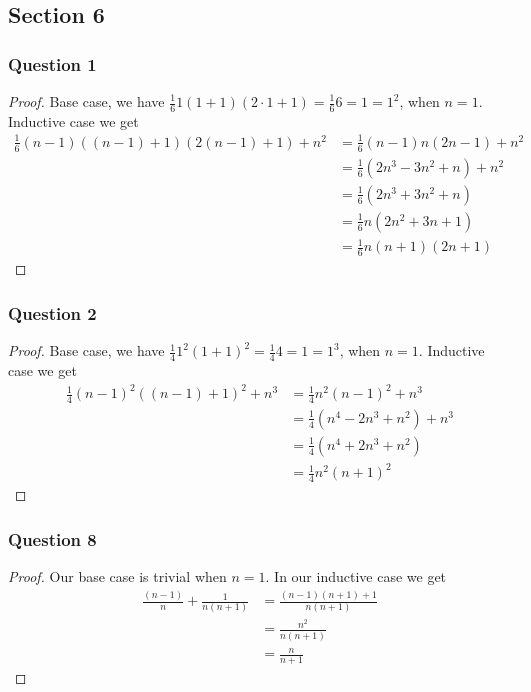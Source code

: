 \documentclass{article}
\begin{document}
\subsection{Section 6}

\subsubsection{Question 1}

\begin{proof}
Base case, we have $\frac161(1+1)(2\cdot 1 + 1) = \frac166 = 1 = 1^2$, when $n = 1$.
Inductive case we get 
\begin{align*}
\frac 16(n-1)((n-1)+1)(2(n-1)+1) + n^2 &=\frac16(n-1)n(2n-1) + n^2 \\
&= \frac16\left(2n^3 - 3n^2+n\right) + n^2 \\
&= \frac16\left(2n^3 + 3n^2+n\right) \\
&= \frac16n(2n^2+3n + 1) \\
&= \frac16n(n+1)(2n+1)
\end{align*}
\end{proof}

\subsubsection{Question 2}

\begin{proof}
	Base case, we have $\frac141^2(1+1)^2 = \frac144 = 1 = 1^3$, when $n = 1$. Inductive case we get 
	\begin{align*}
	\frac14(n-1)^2((n-1)+1)^2 + n^3 &= \frac14n^2(n-1)^2 + n^3 \\
	&= \frac14\left(n^4-2n^3+n^2\right)+n^3\\
	&= \frac14\left(n^4+2n^3+n^2\right)\\
	&= \frac14n^2(n+1)^2
	\end{align*}
\end{proof}

\subsubsection{Question 8}

\begin{proof}
Our base case is trivial when $n=1$. In our inductive case we get
\begin{align*}
\frac{(n-1)}{n} + \frac1{n(n+1)} &= \frac{(n-1)(n+1) + 1}{n(n+1)}\\
&= \frac{n^2}{n(n+1)} \\
&= \frac n{n+1}
\end{align*}
\end{proof}
\end{document}
